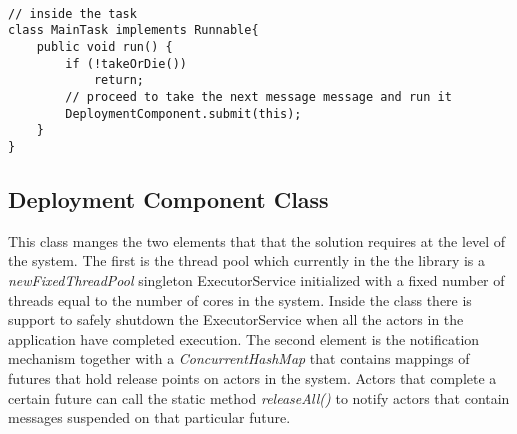 \begin{lstlisting}[caption= Fairness Between Actors]

// inside the task
class MainTask implements Runnable{
	public void run() {
		if (!takeOrDie())
			return;
		// proceed to take the next message message and run it	 
		DeploymentComponent.submit(this);
	}
}
\end{lstlisting}



\subsection{Deployment Component Class}
This class manges the two elements that that the solution requires at the level of the system. The first is the thread pool which currently in the the library is a \textit{newFixedThreadPool} singleton ExecutorService initialized with a fixed number of threads equal to the number of cores in the system. Inside the class there is support to safely shutdown the ExecutorService when all the actors in the application have completed execution. The second element is the notification mechanism together with a \textit{ConcurrentHashMap} that contains mappings of futures that hold release points on actors in the system. Actors that complete a certain future can call the static method \textit{releaseAll()} to notify actors that contain messages suspended on that particular future.


